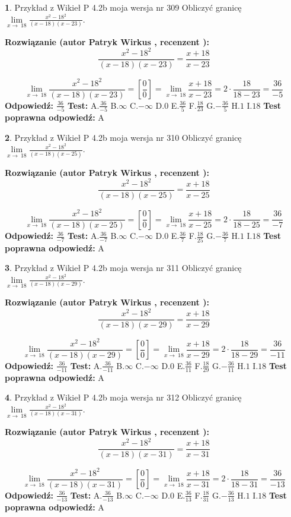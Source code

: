 \documentclass[12pt, a4paper]{article}
\theoremstyle{definition} %
\newtheorem{zad}{}
\newcommand{\zadStart}[1]{\begin{zad}#1\newline}
\newcommand{\zadStop}{\end{zad}}
\newcommand{\rozwStart}[2]{\noindent \textbf{Rozwiązanie (autor #1 , recenzent #2): }\newline}
\newcommand{\rozwStop}{\newline}
\newcommand{\odpStart}{\noindent \textbf{Odpowiedź:}\newline}
\newcommand{\odpStop}{\newline}
\newcommand{\testStart}{\noindent \textbf{Test:}\newline}
\newcommand{\testStop}{\newline}
\newcommand{\kluczStart}{\noindent \textbf{Test poprawna odpowiedź:}\newline}
\newcommand{\kluczStop}{\newline}
\begin{document}
\zadStart{Przykład z Wikieł P 4.2b moja wersja nr 309}
Obliczyć granicę $\lim\limits_{x\to\ 18}\frac{x^{2}-18^{2}}{(x-18)(x-23)}$.
\zadStop
\rozwStart{Patryk Wirkus}{}
$$\frac{x^{2}-18^{2}}{(x-18)(x-23)}=\frac{x+18}{x-23}$$

$$\lim\limits_{x\to\ 18}\frac{x^{2}-18^{2}}{(x-18)(x-23)}=[\frac{0}{0}]=\lim\limits_{x\to\ 18}\frac{x+18}{x-23}=2 \cdot \frac{18}{18-23} = \frac{36}{-5}$$
\rozwStop
\odpStart
$\frac{36}{-5}$
\odpStop
\testStart
A.$\frac{36}{-5}$
B.$\infty$
C.$-\infty$
D.$0$
E.$\frac{36}{5}$
F.$\frac{18}{23}$
G.$-\frac{36}{5}$
H.$1$
I.$18$
\testStop
\kluczStart
A
\kluczStop



\zadStart{Przykład z Wikieł P 4.2b moja wersja nr 310}
Obliczyć granicę $\lim\limits_{x\to\ 18}\frac{x^{2}-18^{2}}{(x-18)(x-25)}$.
\zadStop
\rozwStart{Patryk Wirkus}{}
$$\frac{x^{2}-18^{2}}{(x-18)(x-25)}=\frac{x+18}{x-25}$$

$$\lim\limits_{x\to\ 18}\frac{x^{2}-18^{2}}{(x-18)(x-25)}=[\frac{0}{0}]=\lim\limits_{x\to\ 18}\frac{x+18}{x-25}=2 \cdot \frac{18}{18-25} = \frac{36}{-7}$$
\rozwStop
\odpStart
$\frac{36}{-7}$
\odpStop
\testStart
A.$\frac{36}{-7}$
B.$\infty$
C.$-\infty$
D.$0$
E.$\frac{36}{7}$
F.$\frac{18}{25}$
G.$-\frac{36}{7}$
H.$1$
I.$18$
\testStop
\kluczStart
A
\kluczStop



\zadStart{Przykład z Wikieł P 4.2b moja wersja nr 311}
Obliczyć granicę $\lim\limits_{x\to\ 18}\frac{x^{2}-18^{2}}{(x-18)(x-29)}$.
\zadStop
\rozwStart{Patryk Wirkus}{}
$$\frac{x^{2}-18^{2}}{(x-18)(x-29)}=\frac{x+18}{x-29}$$

$$\lim\limits_{x\to\ 18}\frac{x^{2}-18^{2}}{(x-18)(x-29)}=[\frac{0}{0}]=\lim\limits_{x\to\ 18}\frac{x+18}{x-29}=2 \cdot \frac{18}{18-29} = \frac{36}{-11}$$
\rozwStop
\odpStart
$\frac{36}{-11}$
\odpStop
\testStart
A.$\frac{36}{-11}$
B.$\infty$
C.$-\infty$
D.$0$
E.$\frac{36}{11}$
F.$\frac{18}{29}$
G.$-\frac{36}{11}$
H.$1$
I.$18$
\testStop
\kluczStart
A
\kluczStop



\zadStart{Przykład z Wikieł P 4.2b moja wersja nr 312}
Obliczyć granicę $\lim\limits_{x\to\ 18}\frac{x^{2}-18^{2}}{(x-18)(x-31)}$.
\zadStop
\rozwStart{Patryk Wirkus}{}
$$\frac{x^{2}-18^{2}}{(x-18)(x-31)}=\frac{x+18}{x-31}$$

$$\lim\limits_{x\to\ 18}\frac{x^{2}-18^{2}}{(x-18)(x-31)}=[\frac{0}{0}]=\lim\limits_{x\to\ 18}\frac{x+18}{x-31}=2 \cdot \frac{18}{18-31} = \frac{36}{-13}$$
\rozwStop
\odpStart
$\frac{36}{-13}$
\odpStop
\testStart
A.$\frac{36}{-13}$
B.$\infty$
C.$-\infty$
D.$0$
E.$\frac{36}{13}$
F.$\frac{18}{31}$
G.$-\frac{36}{13}$
H.$1$
I.$18$
\testStop
\kluczStart
A
\kluczStop
\end{document}
